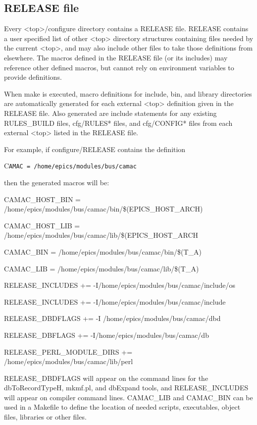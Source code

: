 \subsection{RELEASE file}

Every \textless{}top\textgreater{}/configure directory contains a RELEASE file. RELEASE contains a user specified list of other \textless{}top\textgreater{} 
directory structures containing files needed by the current \textless{}top\textgreater{}, and may also include other files to take those definitions 
from elsewhere. The macros defined in the RELEASE file (or its includes) may reference other defined macros, but 
cannot rely on environment variables to provide definitions.

When make is executed, macro definitions for include, bin, and library directories are automatically generated for each 
external \textless{}top\textgreater{} definition given in the RELEASE file. Also generated are include statements for any existing 
RULES\_BUILD files, cfg/RULES* files, and cfg/CONFIG* files from each external \textless{}top\textgreater{} listed in the RELEASE file.

For example, if configure/RELEASE contains the definition

C\verb|AMAC = /home/epics/modules/bus/camac|

then the generated macros will be:

CAMAC\_HOST\_BIN = /home/epics/modules/bus/camac/bin/\$(EPICS\_HOST\_ARCH)

CAMAC\_HOST\_LIB = /home/epics/modules/bus/camac/lib/\$(EPICS\_HOST\_ARCH

CAMAC\_BIN = /home/epics/modules/bus/camac/bin/\$(T\_A)

CAMAC\_LIB = /home/epics/modules/bus/camac/lib/\$(T\_A)

RELEASE\_INCLUDES += -I/home/epics/modules/bus/camac/include/os

RELEASE\_INCLUDES += -I/home/epics/modules/bus/camac/include

RELEASE\_DBDFLAGS += -I /home/epics/modules/bus/camac/dbd

RELEASE\_DBFLAGS += -I/home/epics/modules/bus/camac/db

RELEASE\_PERL\_MODULE\_DIRS += /home/epics/modules/bus/camac/lib/perl

RELEASE\_DBDFLAGS will appear on the command lines for the dbToRecordTypeH, mkmf.pl, and dbExpand tools, 
and RELEASE\_INCLUDES will appear on compiler command lines. CAMAC\_LIB and CAMAC\_BIN can be used in a 
Makefile to define the location of needed scripts, executables, object files, libraries or other files.

